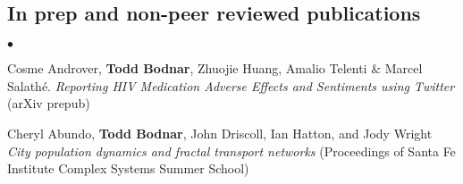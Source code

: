 \documentclass[margin,line]{res}
\newcommand{\linkToUrl}[1]{{\color{blue}\underline{\href{#1}{Link}}}}
\renewcommand{\linkToUrl}[1]{}
\newenvironment{list2}{
  \begin{list}{$\bullet$}{%
      \setlength{\itemsep}{0in}
      \setlength{\parsep}{0in} \setlength{\parskip}{0in}
      \setlength{\topsep}{0in} \setlength{\partopsep}{0in} 
      \setlength{\leftmargin}{10pt}}}{\end{list}}
\begin{document}
\begin{resume}
\section{\sc In prep and non-peer reviewed publications}

\begin{list2}
\item Cosme Androver, \textbf{Todd Bodnar}, Zhuojie Huang, Amalio Telenti
 \& Marcel Salath\'e. \textit{Reporting HIV Medication Adverse Effects and Sentiments using Twitter} (arXiv prepub) \linkToUrl{http://arxiv.org/abs/1404.3610}
\item Cheryl Abundo, \textbf{Todd Bodnar}, John Driscoll, Ian Hatton, and Jody Wright
 \textit{City population dynamics and fractal transport networks} (Proceedings of Santa Fe Institute Complex Systems Summer School) \linkToUrl{bit.ly/19A22vY}%
\end{list2}



\end{resume}
\end{document}
